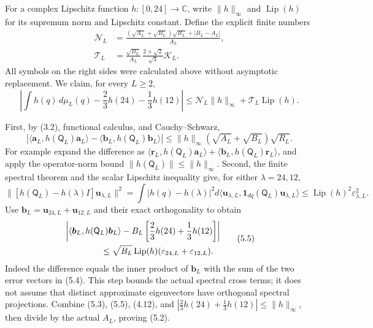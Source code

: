 \documentclass[
  11pt,
]{article}
\begin{document}
For a complex Lipschitz function \(h:[0,24]\to\mathbb C\), write
\(\|h\|_\infty\) and \(\operatorname{Lip}(h)\) for its supremum norm and
Lipschitz constant. Define the explicit finite numbers \[
\begin{split}
\mathcal N_L
 &=\frac{(\sqrt{A_L}+\sqrt{B_L})\sqrt{R_L}+|B_L-A_L|}{A_L},\\
\mathcal T_L
 &=\frac{\sqrt{B_L}}{A_L}\,
           \frac{2+\sqrt2}{\sqrt3}\mathcal K_L.
\end{split}
\tag{5.1}
\] All symbols on the right sides were calculated above without
asymptotic replacement. We claim, for every \(L\ge2\), \[
\boxed{
\left|\int h(q)\,d\mu_L(q)
       -\frac23h(24)-\frac13h(12)\right|
 \le\mathcal N_L\|h\|_\infty
       +\mathcal T_L\operatorname{Lip}(h).}
\tag{5.2}
\]

First, by (3.2), functional calculus, and Cauchy--Schwarz, \[
\left|\langle\boldsymbol a_L,h(\mathsf Q_L)\boldsymbol a_L\rangle
       -\langle\boldsymbol b_L,h(\mathsf Q_L)\boldsymbol b_L\rangle\right|
 \le\|h\|_\infty(\sqrt{A_L}+\sqrt{B_L})\sqrt{R_L}.
\tag{5.3}
\] For example expand the difference as
\(\langle\boldsymbol r_L,h(\mathsf Q_L)\boldsymbol a_L\rangle
+\langle\boldsymbol b_L,h(\mathsf Q_L)\boldsymbol r_L\rangle\), and
apply the operator-norm bound \(\|h(\mathsf Q_L)\|\le\|h\|_\infty\).
Second, the finite spectral theorem and the scalar Lipschitz inequality
give, for either \(\lambda=24,12\), \[
\|[h(\mathsf Q_L)-h(\lambda)I]\boldsymbol u_{\lambda,L}\|^2
 =\int|h(q)-h(\lambda)|^2
       d\langle\boldsymbol u_{\lambda,L},
         \mathbf1_{dq}(\mathsf Q_L)\boldsymbol u_{\lambda,L}\rangle
 \le\operatorname{Lip}(h)^2\varepsilon_{\lambda,L}^2.
\tag{5.4}
\] Use \(\boldsymbol b_L=\boldsymbol u_{24,L}+\boldsymbol u_{12,L}\) and
their exact orthogonality to obtain \[
\begin{split}
&\left|\langle\boldsymbol b_L,h(\mathsf Q_L)\boldsymbol b_L\rangle
       -B_L\left[\frac23h(24)+\frac13h(12)\right]\right|\\
&\hspace{15mm}\le\sqrt{B_L}\operatorname{Lip}(h)
   (\varepsilon_{24,L}+\varepsilon_{12,L}).
\end{split}
\tag{5.5}
\] Indeed the difference equals the inner product of \(\boldsymbol b_L\)
with the sum of the two error vectors in (5.4). This step bounds the
actual spectral cross terms; it does not assume that distinct
approximate eigenvectors have orthogonal spectral projections. Combine
(5.3), (5.5), (4.12), and
\(|\frac23h(24)+\frac13h(12)|\le\|h\|_\infty\), then divide by the
actual \(A_L\), proving (5.2).
\end{document}
